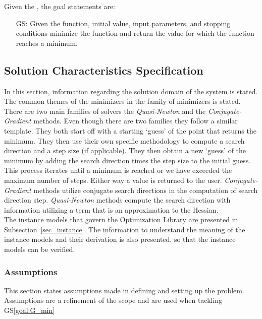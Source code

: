 \documentclass[12pt]{article}
\newcounter{goalnum} %
\begin{document}
\noindent Given the , the goal statements are:
\fi

\begin{itemize}

\item[GS\refstepcounter{goalnum}\thegoalnum \label{goal:G_min}:] Given the function, initial value, input parameters, and stopping conditions minimize the function and return the value for which the function reaches a minimum.

\end{itemize}

\subsection{Solution Characteristics Specification}
In this section, information regarding the solution domain of the system is stated. The common themes of the minimizers in the family of minimizers is stated. There are two main families of solvers the \textit{Quasi-Newton} and the \textit{Conjugate-Gradient} methods. Even though there are two families they follow a similar template. They both start off with a starting `guess' of the point that returns the minimum. They then use their own specific methodology to compute a search direction and a step size (if applicable). They then obtain a new `guess' of the minimum by adding the search direction times the step size to the initial guess. This process iterates until a minimum is reached or we have exceeded the maximum number of steps. Either way a value is returned to the user. \textit{Conjugate-Gradient} methods utilize conjugate search directions in the computation of search direction step. \textit{Quasi-Newton} methods compute the search direction with information utilizing a term that is an approximation to the Hessian.  
\\

The instance models that govern the Optimization Library are presented in
Subsection~\ref{sec_instance}.  The information to understand the meaning of the
instance models and their derivation is also presented, so that the instance
models can be verified.


\subsubsection{Assumptions} \label{sec_assumpt}
This section states assumptions made in defining and setting up the problem. Assumptions are a refinement of the scope and are used when tackling GS\ref{goal:G_min}
\\
\end{document}
